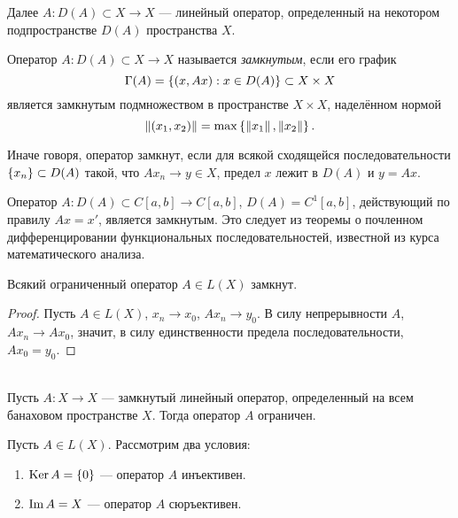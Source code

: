 Далее $A \colon D(A) \subset X \to X$ --- линейный оператор, определенный на некотором
подпространстве $D(A)$ пространства $X$.

\begin{definition}
    Оператор $A \colon D(A) \subset X \to X$ называется \emph{замкнутым}, если его график
    \[ \Gamma(A) = \left\{(x, Ax) : x \in D(A)\right\} \subset X \times X \]
    является замкнутым подмножеством в пространстве $X \times X$, наделённом нормой
    \[ \left\|(x_1, x_2)\right\| = \max\left\{\left\|x_1\right\|, \left\|x_2\right\|\right\}. \]
\end{definition}

Иначе говоря, оператор замкнут, 
если для всякой сходящейся последовательности $\left\{x_n\right\} \subset D(A)$ такой, что
$Ax_n \to y \in X$, предел $x$ лежит в $D(A)$ и $y = Ax$.

\begin{example}
    Оператор $A \colon D(A) \subset C[a,b] \to C[a,b]$, $D(A) = C^1[a,b]$, действующий по правилу
    $Ax = x'$, является замкнутым. Это следует из теоремы о почленном дифференцировании
    функциональных последовательностей, известной из курса математического анализа.
\end{example}

\begin{theorem}
    Всякий ограниченный оператор $A \in L(X)$ замкнут.
\end{theorem}

\begin{proof}
    Пусть $A \in L(X)$, $x_n \to x_0$, $Ax_n \to y_0$. В силу непрерывности $A$, $Ax_n \to Ax_0$, значит, в силу единственности предела последовательности, $Ax_0 = y_0$.
\end{proof}

\begin{theorem}\hfill\\
    \indent Пусть $A \colon X \to X$ --- замкнутый линейный оператор, определенный на всем
    банаховом пространстве $X$. Тогда оператор $A$ ограничен.
\end{theorem}

\vspace{0.5cm}

Пусть $A \in L(X)$. Рассмотрим два условия:
\begin{enumerate}
    \item $\operatorname{Ker} A = \left\{0\right\}$ --- оператор $A$ инъективен.
    \item $\operatorname{Im} A = X$ --- оператор $A$ сюръективен.
\end{enumerate}

